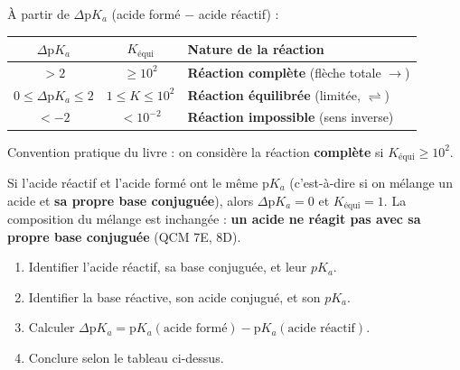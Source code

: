 \documentclass[11pt,a4paper]{article}
\begin{document}
\begin{regle}
À partir de $\Delta\mathrm{p}K_a$ (acide formé $-$ acide réactif) :
\begin{center}
\begin{tabular}{ccl}
\rowcolor{thmcol!18}
$\Delta\mathrm{p}K_a$ & $K_{\text{équi}}$ & Nature de la réaction \\
\midrule
$> 2$ & $\geq 10^{2}$ & \textbf{Réaction complète} (flèche totale $\rightarrow$) \\
$0 \leq \Delta\mathrm{p}K_a \leq 2$ & $1 \leq K \leq 10^{2}$ & \textbf{Réaction équilibrée} (limitée, $\rightleftharpoons$) \\
$< -2$ & $< 10^{-2}$ & \textbf{Réaction impossible} (sens inverse) \\
\bottomrule
\end{tabular}
\end{center}
Convention pratique du livre : on considère la réaction \textbf{complète} si $K_{\text{équi}} \geq 10^{2}$.
\end{regle}

\begin{remarque}[cas particulier $\Delta pK_a = 0$ : pas de réaction]
Si l'acide réactif et l'acide formé ont le même $\mathrm{p}K_a$ (c'est-à-dire si on mélange un acide et
\textbf{sa propre base conjuguée}), alors $\Delta\mathrm{p}K_a = 0$ et $K_{\text{équi}} = 1$. La composition du
mélange est inchangée : \textbf{un acide ne réagit pas avec sa propre base conjuguée} (QCM 7E, 8D).
\end{remarque}

\begin{methode}
\begin{enumerate}[leftmargin=1.6em,topsep=2pt,itemsep=2pt]
  \item Identifier l'acide réactif, sa base conjuguée, et leur $pK_a$.
  \item Identifier la base réactive, son acide conjugué, et son $pK_a$.
  \item Calculer $\Delta\mathrm{p}K_a = \mathrm{p}K_a(\text{acide formé}) - \mathrm{p}K_a(\text{acide réactif})$.
  \item Conclure selon le tableau ci-dessus.
\end{enumerate}
\end{methode}
\end{document}
